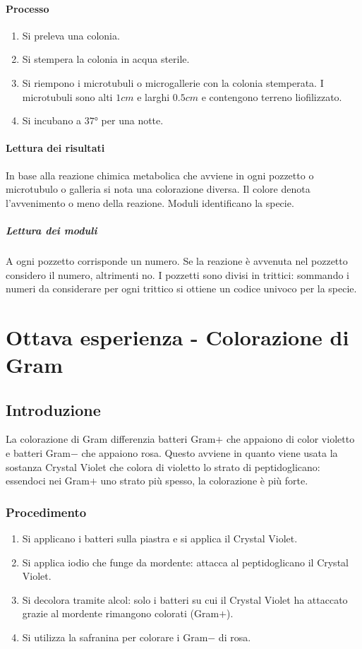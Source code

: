 			\paragraph{Processo}
			\begin{multicols}{2}
				\begin{enumerate}
					\item Si preleva una colonia.
					\item Si stempera la colonia in acqua sterile.
					\item Si riempono i microtubuli o microgallerie con la colonia stemperata.
						I microtubuli sono alti $1\si{cm}$ e larghi $0.5\si{cm}$ e contengono terreno liofilizzato.
					\item Si incubano a $37\si{\degree}$ per una notte.
				\end{enumerate}
			\end{multicols}

			\paragraph{Lettura dei risultati}
			In base alla reazione chimica metabolica che avviene in ogni pozzetto o microtubulo o galleria si nota una colorazione diversa.
			Il colore denota l'avvenimento o meno della reazione.
			Moduli identificano la specie.

				\subparagraph{Lettura dei moduli}
				A ogni pozzetto corrisponde un numero.
				Se la reazione \`e avvenuta nel pozzetto considero il numero, altrimenti no.
				I pozzetti sono divisi in trittici: sommando i numeri da considerare per ogni trittico si ottiene un codice univoco per la specie.

\section{Ottava esperienza - Colorazione di Gram}
	\subsection{Introduzione}
	La colorazione di Gram differenzia batteri Gram$+$ che appaiono di color violetto e batteri Gram$-$ che appaiono rosa.
	Questo avviene in quanto viene usata la sostanza Crystal Violet che colora di violetto lo strato di peptidoglicano: essendoci nei Gram$+$ uno strato pi\`u spesso, la colorazione \`e pi\`u forte.

		\subsubsection{Procedimento}
		\begin{enumerate}
			\item Si applicano i batteri sulla piastra e si applica il Crystal Violet.
			\item Si applica iodio che funge da mordente: attacca al peptidoglicano il Crystal Violet.
			\item Si decolora tramite alcol: solo i batteri su cui il Crystal Violet ha attaccato grazie al mordente rimangono colorati (Gram$+$).
			\item Si utilizza la safranina per colorare i Gram$-$ di rosa.
		\end{enumerate}

